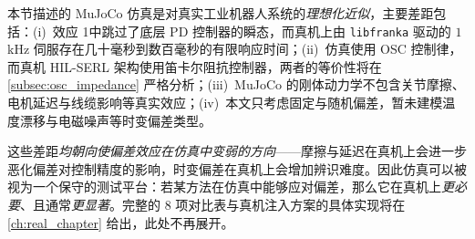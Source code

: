 本节描述的 MuJoCo 仿真是对真实工业机器人系统的\emph{理想化近似}，主要差距包括：(i)~效应 1中跳过了底层 PD 控制器的瞬态，而真机上由 \texttt{libfranka} 驱动的 $1$\,kHz 伺服存在几十毫秒到数百毫秒的有限响应时间；(ii)~仿真使用 OSC 控制律，而真机 HIL-SERL 架构使用笛卡尔阻抗控制器，两者的等价性将在\cref{subsec:osc_impedance} 严格分析；(iii)~MuJoCo 的刚体动力学不包含关节摩擦、电机延迟与线缆影响等真实效应；(iv)~本文只考虑固定与随机偏差，暂未建模温度漂移与电磁噪声等时变偏差类型。

这些差距\emph{均朝向使偏差效应在仿真中变弱的方向}——摩擦与延迟在真机上会进一步恶化偏差对控制精度的影响，时变偏差在真机上会增加辨识难度。因此仿真可以被视为一个保守的测试平台：若某方法在仿真中能够应对偏差，那么它在真机上\emph{更必要}、且通常\emph{更显著}。完整的 8 项对比表与真机注入方案的具体实现将在\cref{ch:real_chapter} 给出，此处不再展开。
